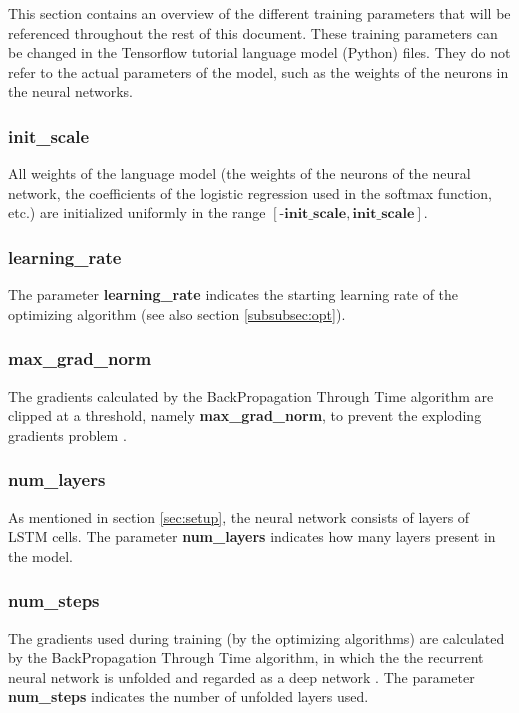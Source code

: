 \documentclass[10pt,a4paper,titlepage]{article}
\begin{document}
This section contains an overview of the different training parameters that will be referenced throughout the rest of this document. These training parameters can be changed in the Tensorflow tutorial language model (Python) files. They do not refer to the actual parameters of the model, such as the weights of the neurons in the neural networks.

\subsubsection{init\_scale}
	
All weights of the language model (the weights of the neurons of the neural network, the coefficients of the logistic regression used in the softmax function, etc.) are initialized uniformly in the range $[\textbf{-init\_scale},\textbf{init\_scale}]$.

\subsubsection{learning\_rate}

The parameter \textbf{learning\_rate} indicates the starting learning rate of the optimizing algorithm (see also section \ref{subsubsec:opt}).

\subsubsection{max\_grad\_norm}

The gradients calculated by the BackPropagation Through Time algorithm are clipped at a threshold, namely \textbf{max\_grad\_norm}, to prevent the exploding gradients problem \cite{bptt,exp}.

\subsubsection{num\_layers}

As mentioned in section \ref{sec:setup}, the neural network consists of layers of LSTM cells. The parameter \textbf{num\_layers} indicates how many layers present in the model.

\subsubsection{num\_steps}
\label{subsubsec:numsteps}

The gradients used during training (by the optimizing algorithms) are calculated by the BackPropagation Through Time algorithm, in which the the recurrent neural network is unfolded and regarded as a deep network \cite{bptt}. The parameter \textbf{num\_steps} indicates the number of unfolded layers used.
\end{document}

